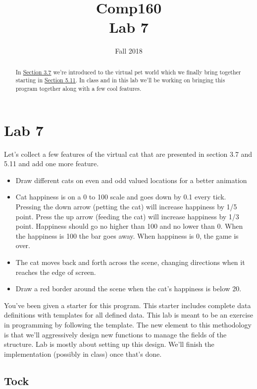 \documentclass[nobib]{tufte-handout}
\title{Comp160 \\ Lab 7 }
\author{}
\date{ Fall 2018 }
\begin{document}
\maketitle

\begin{abstract}
In \href{https://htdp.org/2018-01-06/Book/part_one.html#%28part._sec~3azoo1%29}{Section 3.7} we're introduced to the virtual pet world which we finally bring together starting in \href{http://htdp.org/2018-01-06/Book/part_one.html#%28part._sec~3azoo2%29}{Section 5.11}.  In class and in this lab we'll be working on bringing this program together along with a few cool features.
\end{abstract}

\section*{Lab 7}

Let's collect a few features of the virtual cat that are presented in section 3.7 and 5.11 and add one more feature.
\begin{itemize}
  \item Draw different cats on even and odd valued locations for a better animation
  \item Cat happiness is on a 0 to 100 scale and goes down by 0.1 every tick. Pressing the down arrow (petting the cat) will increase happiness by 1/5 point. Press the up arrow (feeding the cat) will increase happiness by 1/3 point. Happiness should go no higher than 100 and no lower than 0. When the happiness is 100 the bar goes away. When happiness is 0, the game is over.
  \item The cat moves back and forth across the scene, changing directions when it reaches the edge of screen.
  \item Draw a red border around the scene when the cat's happiness is below 20.
\end{itemize}

You've been given a starter for this program. This starter includes complete data definitions with templates for all defined data. This lab is meant to be an exercise in programming by following the template. The new element to this methodology is that we'll aggressively design new functions to manage the fields of the structure. Lab is mostly about setting up this design. We'll finish the implementation (possibly in class) once that's done.

\subsection*{Tock}
\end{document}
